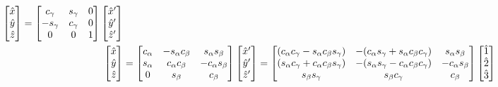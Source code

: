 \documentclass[10pt]{article}
\begin{document}
\begin{align}
\begin{bmatrix}
        \hat x\\
        \hat y\\
        \hat z
    \end{bmatrix}
    =
    \begin{bmatrix}
        c_\gamma & s_\gamma & 0 \\
        -s_\gamma & c_\gamma & 0 \\
        0 & 0 & 1
    \end{bmatrix}
    \begin{bmatrix}
        \hat{x}' \\
        \hat{y}' \\
        \hat{z}'
    \end{bmatrix}
    \notag\\
    \begin{bmatrix}
        \hat x\\
        \hat y\\
        \hat z
    \end{bmatrix}
    &=
    \begin{bmatrix}
        c_\alpha & -s_\alpha c_\beta & s_\alpha s_\beta \\
        s_\alpha & c_\alpha c_\beta & -c_\alpha s_\beta \\
        0 & s_\beta & c_\beta
    \end{bmatrix}
    \begin{bmatrix}
        \hat{x}' \\
        \hat{y}' \\
        \hat{z}'
    \end{bmatrix}
    =
    \begin{bmatrix}
        (c_\alpha c_\gamma - s_\alpha c_\beta s_\gamma) &
            -(c_\alpha s_\gamma+ s_\alpha c_\beta c_\gamma) &
            s_\alpha s_\beta \\
        (s_\alpha c_\gamma + c_\alpha c_\beta s_\gamma) &
            -(s_\alpha s_\gamma- c_\alpha c_\beta c_\gamma) &
            -c_\alpha s_\beta \\ 
        s_\beta s_\gamma & s_\beta c_\gamma & c_\beta
    \end{bmatrix}
    \begin{bmatrix}
        \hat1 \\
        \hat2 \\
        \hat3
    \end{bmatrix}
    \label{123toxyz}
\end{align}
\end{document}
